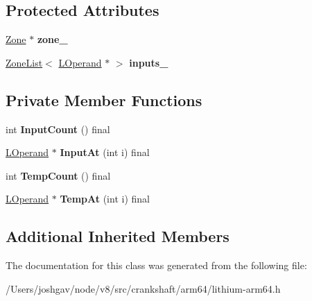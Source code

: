 \subsection*{Protected Attributes}
\begin{DoxyCompactItemize}
\item 
\hyperlink{classv8_1_1internal_1_1_zone}{Zone} $\ast$ {\bfseries zone\+\_\+}\hypertarget{classv8_1_1internal_1_1_l_push_arguments_ae36d64a391f984bbe6ef2ad6d79611a9}{}\label{classv8_1_1internal_1_1_l_push_arguments_ae36d64a391f984bbe6ef2ad6d79611a9}

\item 
\hyperlink{classv8_1_1internal_1_1_zone_list}{Zone\+List}$<$ \hyperlink{classv8_1_1internal_1_1_l_operand}{L\+Operand} $\ast$ $>$ {\bfseries inputs\+\_\+}\hypertarget{classv8_1_1internal_1_1_l_push_arguments_a73ea97cfc65958f06ef14c4101f7e94f}{}\label{classv8_1_1internal_1_1_l_push_arguments_a73ea97cfc65958f06ef14c4101f7e94f}

\end{DoxyCompactItemize}
\subsection*{Private Member Functions}
\begin{DoxyCompactItemize}
\item 
int {\bfseries Input\+Count} () final\hypertarget{classv8_1_1internal_1_1_l_push_arguments_a75f7ee654f3c9a4eeb05e58cf27ab034}{}\label{classv8_1_1internal_1_1_l_push_arguments_a75f7ee654f3c9a4eeb05e58cf27ab034}

\item 
\hyperlink{classv8_1_1internal_1_1_l_operand}{L\+Operand} $\ast$ {\bfseries Input\+At} (int i) final\hypertarget{classv8_1_1internal_1_1_l_push_arguments_aaae2fe6fffc4de0016e9b739013e700b}{}\label{classv8_1_1internal_1_1_l_push_arguments_aaae2fe6fffc4de0016e9b739013e700b}

\item 
int {\bfseries Temp\+Count} () final\hypertarget{classv8_1_1internal_1_1_l_push_arguments_ae6de9b966bb4392a36da30bd18943245}{}\label{classv8_1_1internal_1_1_l_push_arguments_ae6de9b966bb4392a36da30bd18943245}

\item 
\hyperlink{classv8_1_1internal_1_1_l_operand}{L\+Operand} $\ast$ {\bfseries Temp\+At} (int i) final\hypertarget{classv8_1_1internal_1_1_l_push_arguments_adec1e2f32f36a312ed2b6a57133be6d2}{}\label{classv8_1_1internal_1_1_l_push_arguments_adec1e2f32f36a312ed2b6a57133be6d2}

\end{DoxyCompactItemize}
\subsection*{Additional Inherited Members}


The documentation for this class was generated from the following file\+:\begin{DoxyCompactItemize}
\item 
/\+Users/joshgav/node/v8/src/crankshaft/arm64/lithium-\/arm64.\+h\end{DoxyCompactItemize}
